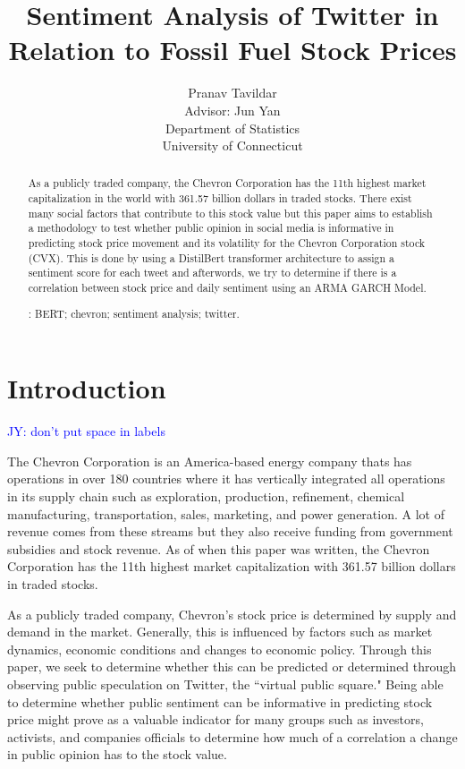\documentclass[12pt, letterpaper, titlepage]{article}
\title{Sentiment Analysis of Twitter in Relation to Fossil Fuel Stock Prices}
\author{Pranav Tavildar\\[2ex]
  Advisor: Jun Yan\\[2ex]
  Department of Statistics\\
  University of Connecticut
}
\newcommand{\jy}[1]{\textcolor{blue}{JY: #1}}
\begin{document}
\maketitle
\doublespace

\begin{abstract}
As a publicly traded company, the Chevron Corporation has the 11th highest market capitalization in the world with 361.57 billion dollars in traded stocks. There exist many social factors that contribute to this stock value but this paper aims to establish a methodology to test whether public opinion in social media is informative in predicting stock price movement and its volatility for the Chevron Corporation stock (CVX). This is done by using a DistilBert transformer architecture to assign a sentiment score for each tweet and afterwords, we try to determine if there is a correlation between stock price and daily sentiment using an ARMA GARCH Model.



\bigskip
{}:
BERT;
chevron;
sentiment analysis;
twitter.
\end{abstract}

\section{Introduction}
\label{sec: intro}
\jy{don't put space in labels}

The Chevron Corporation is an America-based energy company thats has operations in over 180 countries where it has vertically integrated all operations in its supply chain such as exploration, production, refinement, chemical manufacturing, transportation, sales, marketing, and power generation. A lot of revenue comes from these streams but they also receive funding from government subsidies and stock revenue. As of when this paper was written, the Chevron Corporation has the 11th highest market capitalization with 361.57 billion dollars in traded stocks.

As a publicly traded company, Chevron's stock price is determined by supply and demand in the market. Generally, this is influenced by factors such as market dynamics, economic conditions and changes to economic policy. Through this paper, we seek to determine whether this can be predicted or determined through observing public speculation on Twitter, the ``virtual public square." Being able to determine whether public sentiment can be informative in predicting stock price might prove as a valuable indicator for many groups such as investors, activists, and companies officials to determine how much of a correlation a change in public opinion has to the stock value.  	
\end{document}
